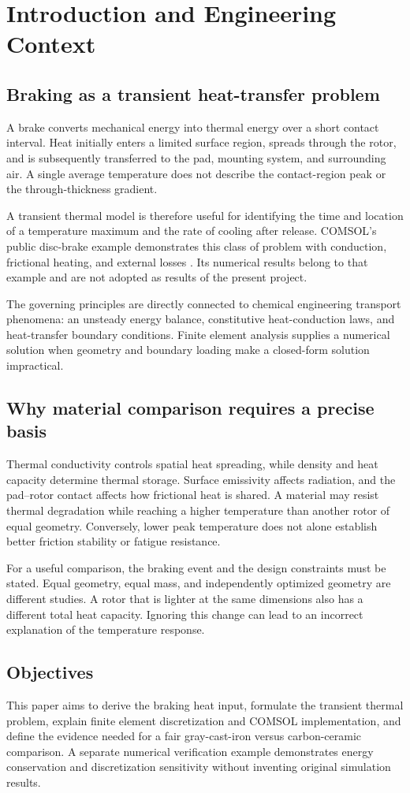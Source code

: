 \documentclass[11pt,a4paper]{article}
\newcommand{\sectionpage}[1]{\clearpage\section{#1}}
\begin{document}
\sectionpage{Introduction and Engineering Context}
\subsection{Braking as a transient heat-transfer problem}
A brake converts mechanical energy into thermal energy over a short contact interval. Heat initially enters a limited surface region, spreads through the rotor, and is subsequently transferred to the pad, mounting system, and surrounding air. A single average temperature does not describe the contact-region peak or the through-thickness gradient.

A transient thermal model is therefore useful for identifying the time and location of a temperature maximum and the rate of cooling after release. COMSOL's public disc-brake example demonstrates this class of problem with conduction, frictional heating, and external losses \cite{comsol}. Its numerical results belong to that example and are not adopted as results of the present project.

The governing principles are directly connected to chemical engineering transport phenomena: an unsteady energy balance, constitutive heat-conduction laws, and heat-transfer boundary conditions. Finite element analysis supplies a numerical solution when geometry and boundary loading make a closed-form solution impractical.

\subsection{Why material comparison requires a precise basis}
Thermal conductivity controls spatial heat spreading, while density and heat capacity determine thermal storage. Surface emissivity affects radiation, and the pad--rotor contact affects how frictional heat is shared. A material may resist thermal degradation while reaching a higher temperature than another rotor of equal geometry. Conversely, lower peak temperature does not alone establish better friction stability or fatigue resistance.

For a useful comparison, the braking event and the design constraints must be stated. Equal geometry, equal mass, and independently optimized geometry are different studies. A rotor that is lighter at the same dimensions also has a different total heat capacity. Ignoring this change can lead to an incorrect explanation of the temperature response.

\subsection{Objectives}
This paper aims to derive the braking heat input, formulate the transient thermal problem, explain finite element discretization and COMSOL implementation, and define the evidence needed for a fair gray-cast-iron versus carbon-ceramic comparison. A separate numerical verification example demonstrates energy conservation and discretization sensitivity without inventing original simulation results.
\end{document}
